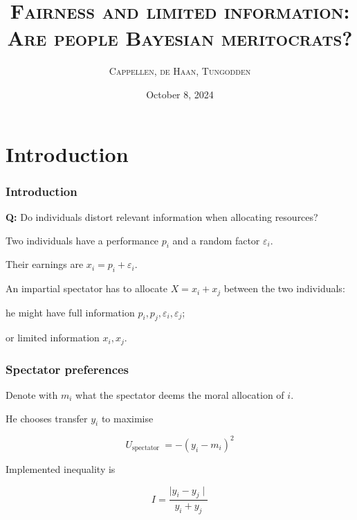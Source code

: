 \documentclass[usenames,dvipsnames,aspectratio=169,11pt, envcountsect]{beamer}
\title {\textsc{Fairness and limited information: Are people Bayesian meritocrats?}}
\author{\textsc{Cappellen, de Haan, Tungodden}}
\date{October 8, 2024}
\begin{document}
\section{Introduction}

\begin{frame}
	\maketitle

\end{frame}

\begin{frame}\frametitle{Introduction}

	\textbf{Q:} Do individuals distort relevant information when allocating resources?

	\vfill

	Two individuals have a performance \( p_i \) and a random factor \( \varepsilon_i \).

	\vfill

	Their earnings are \( x_i = p_i + \varepsilon_i \).

	\vfill

	An impartial spectator has to allocate \( X = x_i + x_j \) between the two individuals:

	\vfill

	\begin{wideitemize}
		\item he might have full information \( p_i, p_j, \varepsilon_i, \varepsilon_j \);
		\item or limited information \( x_i, x_j \).
	\end{wideitemize}

\end{frame}

\begin{frame}\frametitle{Spectator preferences}
	Denote with \( m_i \) what the spectator deems the moral allocation of \( i \).

	\vfill

	He chooses transfer \( y_i \) to maximise

	\[
		U_{\text {spectator }}=- \left(y_i-m_i \right)^2
	\]

	\vfill

	Implemented inequality is

	\[
		I = \frac{ \mid y_i - y_j \mid}{y_i + y_j}
	\]

\end{frame}
\end{document}
